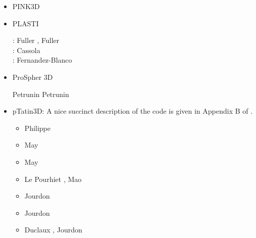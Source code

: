 \begin{itemize}
\item PINK3D

{\small
\noindent
\cite{vosc15}
}


\item PLASTI

\begin{scriptsize}
\twothousandsix: Fuller \etal \cite{fuwb06}, Fuller \etal \cite{fuwf06}\\
\twothousandthirteen: Cassola \cite{cass13}\\
\twothousandtwenty: Fernandez-Blanco \cite{femb20}
\end{scriptsize}

\item ProSpher 3D

Petrunin \etal \cite{pekr13} 
Petrunin \etal \cite{peke20}


\item pTatin3D: A nice succinct description of the code is given in Appendix B of \cite{lemh17}. 

\begin{scriptsize}
\begin{itemize}
\item[\twothousandthirteen] Philippe \cite{phil13}
\item[\twothousandfourteen] May \etal \cite{mabl14}
\item[\twothousandfifteen] May \etal \cite{mabl15}
\item[\twothousandseventeen] Le Pourhiet \etal \cite{lemh17}, Mao \etal \cite{magm17}
\item[\twothousandeighteen] Jourdon \etal \cite{jolp18}
\item[\twothousandnineteen] Jourdon \etal \cite{jolm19}
\item[\twothousandtwenty] Duclaux \etal \cite{duhm20}, Jourdon \etal \cite{jolm20}
\end{itemize}
\end{scriptsize}


\end{itemize}

